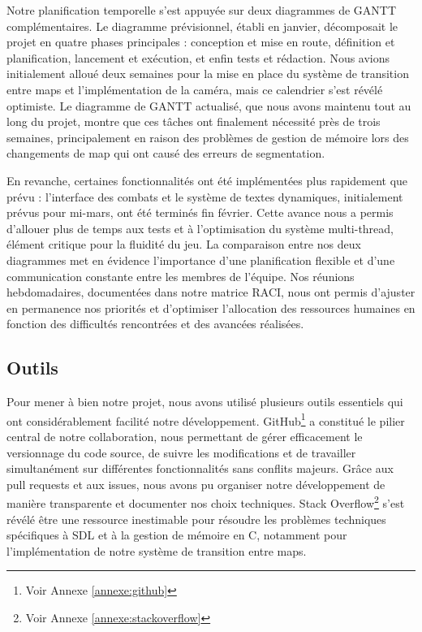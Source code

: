 \documentclass[12pt,a4paper, twoside]{article}
\begin{document}
Notre planification temporelle s'est appuyée sur deux diagrammes de GANTT complémentaires. Le diagramme prévisionnel, établi en janvier, décomposait le projet en quatre phases principales : conception et mise en route, définition et planification, lancement et exécution, et enfin tests et rédaction. Nous avions initialement alloué deux semaines pour la mise en place du système de transition entre maps et l'implémentation de la caméra, mais ce calendrier s'est révélé optimiste. Le diagramme de GANTT actualisé, que nous avons maintenu tout au long du projet, montre que ces tâches ont finalement nécessité près de trois semaines, principalement en raison des problèmes de gestion de mémoire lors des changements de map qui ont causé des erreurs de segmentation.

En revanche, certaines fonctionnalités ont été implémentées plus rapidement que prévu : l'interface des combats et le système de textes dynamiques, initialement prévus pour mi-mars, ont été terminés fin février. Cette avance nous a permis d'allouer plus de temps aux tests et à l'optimisation du système multi-thread, élément critique pour la fluidité du jeu. La comparaison entre nos deux diagrammes met en évidence l'importance d'une planification flexible et d'une communication constante entre les membres de l'équipe. Nos réunions hebdomadaires, documentées dans notre matrice RACI, nous ont permis d'ajuster en permanence nos priorités et d'optimiser l'allocation des ressources humaines en fonction des difficultés rencontrées et des avancées réalisées.

\subsection{Outils}
Pour mener à bien notre projet, nous avons utilisé plusieurs outils essentiels qui ont considérablement facilité notre développement. GitHub\footnote{Voir Annexe \ref{annexe:github}} a constitué le pilier central de notre collaboration, nous permettant de gérer efficacement le versionnage du code source, de suivre les modifications et de travailler simultanément sur différentes fonctionnalités sans conflits majeurs. Grâce aux pull requests et aux issues, nous avons pu organiser notre développement de manière transparente et documenter nos choix techniques. Stack Overflow\footnote{Voir Annexe \ref{annexe:stackoverflow}} s'est révélé être une ressource inestimable pour résoudre les problèmes techniques spécifiques à SDL et à la gestion de mémoire en C, notamment pour l'implémentation de notre système de transition entre maps.
\end{document}
